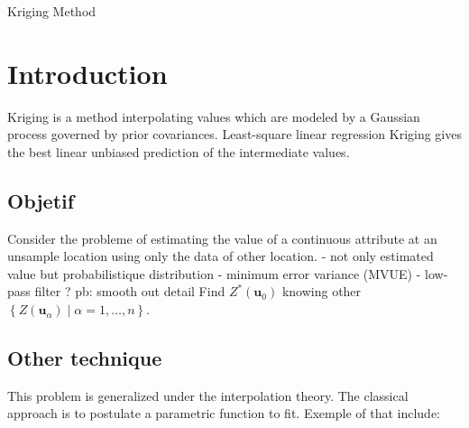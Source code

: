 \documentclass[twocolumn]{article}
\numberwithin{equation}{section}
\begin{document}
\begin{center}
     \Large{Kriging Method } \\
\end{center}

\section{Introduction}
Kriging is a method interpolating values which are modeled by a Gaussian process governed by prior covariances.
Least-square linear regression 
Kriging gives the best linear unbiased prediction of the intermediate values.

\subsection{Objetif}
Consider the probleme of estimating the value of a continuous attribute at an unsample location using only the data of other location.
- not only estimated value but probabilistique distribution
- minimum error variance (MVUE)
- low-pass filter ?
pb: smooth out detail
Find $Z^*(\boldsymbol{u}_0)$ knowing other $\left\{ Z(\boldsymbol{u}_\alpha) \mid \alpha =1,\ldots,n \right\}$.


\subsection{Other technique}
This problem is generalized under the interpolation theory. The classical approach is to postulate a parametric function to fit. Exemple of that include:
\end{document}
